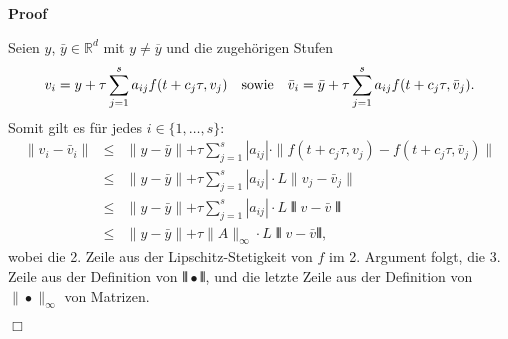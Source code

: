\documentclass{book}
\newenvironment{enumerateroman}{\begin{enumerate}[i.] }{\end{enumerate}}
\newenvironment{proof}{\noindent\textbf{Proof\ }}{\hspace*{\fill}$\Box$\medskip}
\begin{document}
\begin{proof}
\begin{enumerateroman}
    Seien $y$, $\bar{y} \in \mathbb{R}^d$ mit $y \neq \overline{y}$ und die
    zugeh{\"o}rigen Stufen
    \[ v_i = y + \tau \sum_{j = 1}^s a_{i j} f (t + c_j \tau, v_j) \quad
       \text{sowie\quad} \bar{v}_i = \bar{y} + \tau \sum_{j = 1}^s a_{i j} f
       (t + c_j \tau, \bar{v}_j) . \]
    {\hspace{1.7em}}Somit gilt es f{\"u}r jedes $i \in \{ 1, \ldots, s \}$:
    \begin{eqnarray*}
      \parallel v_i - \bar{v}_i \parallel & \leq & \parallel y - \bar{y} 
      \parallel + \tau \sum_{j = 1}^s | a_{i j} | \cdot \parallel f (t + c_j
      \tau, v_j) - f (t + c_j \tau, \bar{v}_j) \parallel\\
      & \leq & \parallel y - \bar{y}  \parallel + \tau \sum_{j = 1}^s | a_{i
      j} | \cdot L \parallel v_j - \bar{v}_j \parallel\\
      & \leq & \parallel y - \bar{y}  \parallel + \tau \sum_{j = 1}^s | a_{i
      j} | \cdot L \interleave v  - \bar{v}  \interleave\\
      & \leq & \parallel y - \bar{y}  \parallel + \tau \parallel A
      \parallel_{\infty} \cdot L \interleave v  - \bar{v}  \interleave,
    \end{eqnarray*}
    wobei die 2. Zeile aus der Lipschitz-Stetigkeit von $f$ im 2. Argument
    folgt, die 3. Zeile aus der Definition von $\interleave \bullet
    \interleave$, und die letzte Zeile aus der Definition von $\| \bullet
    \|_{\infty}$ von Matrizen.
    

\end{enumerateroman}
\end{proof}
\end{document}
